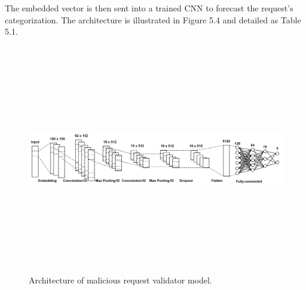 The embedded vector is then sent into a trained CNN to forecast the request's categorization. The architecture is illustrated in Figure 5.4 and detailed as Table 5.1.

\begin{figure}[ht]
	\centering
	\includegraphics[width=\linewidth, height=10cm,keepaspectratio]{figures/layers.png}
  \caption{Architecture of malicious request validator model.}
\end{figure} 

